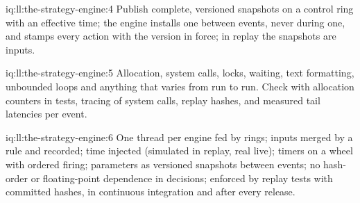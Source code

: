 \begin{solution}{iq:ll:the-strategy-engine:4}
Publish complete, versioned snapshots on a control ring with an effective time; the engine installs one between events, never
during one, and stamps every action with the version in force; in replay the snapshots are inputs.
\end{solution}

\begin{solution}{iq:ll:the-strategy-engine:5}
Allocation, system calls, locks, waiting, text formatting, unbounded loops and anything that varies from run to run. Check with
allocation counters in tests, tracing of system calls, replay hashes, and measured tail latencies per event.
\end{solution}

\begin{solution}{iq:ll:the-strategy-engine:6}
One thread per engine fed by rings; inputs merged by a rule and recorded; time injected (simulated in replay, real live); timers
on a wheel with ordered firing; parameters as versioned snapshots between events; no hash-order or floating-point dependence
in decisions; enforced by replay tests with committed hashes, in continuous integration and after every release.
\end{solution}
